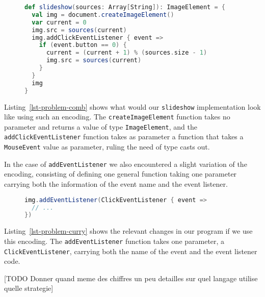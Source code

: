 \documentclass{llncs}
\newcommand{\jscode}[1]{\lstinline[language=JavaScript]|#1|}
\newcommand{\scalacode}[1]{\lstinline[language=Scala]|#1|}
\begin{document}
\begin{figure}
\begin{lstlisting}[label=lst-problem-comb,language=Scala,caption={Scala implementation of \texttt{slideshow} using specialized functions}]
def slideshow(sources: Array[String]): ImageElement = {
  val img = document.createImageElement()
  var current = 0
  img.src = sources(current)
  img.addClickEventListener { event =>
    if (event.button == 0) {
      current = (current + 1) % (sources.size - 1)
      img.src = sources(current)
    }
  }
  img
}
\end{lstlisting}
\end{figure}

Listing~\ref{lst-problem-comb} shows what would our \scalacode{slideshow} implementation look like using such an encoding. The \scalacode{createImageElement} function takes no parameter and returns a value of type \scalacode{ImageElement}, and the \scalacode{addClickEventListener} function takes as parameter a function that takes a \scalacode{MouseEvent} value as parameter, ruling the need of type casts out.

In the case of \jscode{addEventListener} we also encountered a slight variation of the encoding, consisting of defining one general function taking one parameter carrying both the 
information of the event name and the event listener.

\begin{figure}
\begin{lstlisting}[label=lst-problem-curry,language=Scala,caption={Implementation of \texttt{slideshow} using a general \texttt{addEventListener} function taking one parameter containing both the event name and the even listener}]
img.addEventListener(ClickEventListener { event =>
  // ...
})
\end{lstlisting}
\end{figure}

Listing~\ref{lst-problem-curry} shows the relevant changes in our program if we use this encoding. The \scalacode{addEventListener} function takes one parameter, a \scalacode{ClickEventListener}, carrying both the name of the event and the event listener code.

[TODO Donner quand meme des chiffres un peu detailles sur quel langage utilise quelle strategie]
\end{document}
